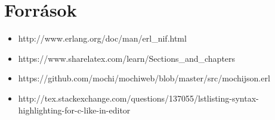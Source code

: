 \documentclass{elteikthesis}
\begin{document}
\chapter{Források}
\begin{itemize}
\item {http://www.erlang.org/doc/man/erl\_nif.html}
\item {https://www.sharelatex.com/learn/Sections\_and\_chapters}
\item {https://github.com/mochi/mochiweb/blob/master/src/mochijson.erl} 
\item {http://tex.stackexchange.com/questions/137055/lstlisting-syntax-highlighting-for-c-like-in-editor} 
\end{itemize}
\end{document}

